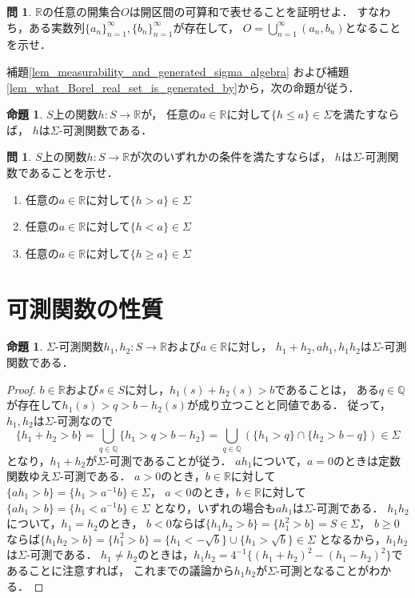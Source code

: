 \documentclass{jsreport}
\theoremstyle{definition}
\newtheorem{prop}[defi]{命題}
\newtheorem{qst}[defi]{問}
\begin{document}
\begin{qst}\label{qst_real_open_set_is_countable_union_of_open_interval}
$\mathbb{R}$の任意の開集合$O$は開区間の可算和で表せることを証明せよ．
すなわち，ある実数列$\{a_n\}_{n=1}^\infty, \{b_n\}_{n=1}^\infty$が存在して，
$O=\displaystyle\bigcup_{n=1}^\infty(a_n,b_n)$となることを示せ．
\end{qst}

補題\ref{lem_measurability_and_generated_sigma_algebra}
および補題\ref{lem_what_Borel_real_set_is_generated_by}から，次の命題が従う．

\begin{prop}\label{prop_technique_to_check_measurability}
$S$上の関数$h \colon S\to\mathbb{R}$が，
任意の$a\in\mathbb{R}$に対して$\{h \leq a\}\in\Sigma$を満たすならば，
$h$は$\Sigma$-可測関数である．
\end{prop}

\begin{qst}\label{qst_technique_to_check_measurability}
$S$上の関数$h \colon S\to\mathbb{R}$が次のいずれかの条件を満たすならば，
$h$は$\Sigma$-可測関数であることを示せ．
\begin{enumerate}
\item 任意の$a\in\mathbb{R}$に対して$\{h > a\}\in\Sigma$
\item 任意の$a\in\mathbb{R}$に対して$\{h < a\}\in\Sigma$
\item 任意の$a\in\mathbb{R}$に対して$\{h \geq a\}\in\Sigma$
\end{enumerate}
\end{qst}

\section{可測関数の性質}

\begin{prop}\label{prop_measurable_function_and_arithmetic}
$\Sigma$-可測関数$h_1,h_2 \colon S\to\mathbb{R}$および$a\in\mathbb{R}$に対し，
$h_1+h_2, ah_1, h_1h_2$は$\Sigma$-可測関数である．
\end{prop}

\begin{proof}
$b\in\mathbb{R}$および$s \in S$に対し，$h_1(s)+h_2(s)>b$であることは，
ある$q\in\mathbb{Q}$が存在して$h_1(s)>q>b-h_2(s)$が成り立つことと同値である．
従って，$h_1,h_2$は$\Sigma$-可測なので
\[ \{h_1+h_2>b\}=\bigcup_{q\in\mathbb{Q}}\{h_1>q>b-h_2\}
=\bigcup_{q\in\mathbb{Q}}(\{h_1>q\}\cap\{h_2>b-q\})\in\Sigma \]
となり，$h_1+h_2$が$\Sigma$-可測であることが従う．
$ah_1$について，$a=0$のときは定数関数ゆえ$\Sigma$-可測である．
$a>0$のとき，$b\in\mathbb{R}$に対して$\{ah_1>b\}=\{h_1>a^{-1}b\}\in\Sigma$，
$a<0$のとき，$b\in\mathbb{R}$に対して$\{ah_1>b\}=\{h_1<a^{-1}b\}\in\Sigma$
となり，いずれの場合も$ah_1$は$\Sigma$-可測である．
$h_1h_2$について，$h_1=h_2$のとき，
$b<0$ならば$\{h_1h_2>b\}=\{h_1^2>b\}=S\in\Sigma$，
$b\geq0$ならば$\{h_1h_2>b\}=\{h_1^2>b\}=\{h_1<-\sqrt{b}\}\cup\{h_1>\sqrt{b}\}\in\Sigma$
となるから，$h_1h_2$は$\Sigma$-可測である．
$h_1 \neq h_2$のときは，$h_1h_2=4^{-1}\{(h_1+h_2)^2-(h_1-h_2)^2\}$であることに注意すれば，
これまでの議論から$h_1h_2$が$\Sigma$-可測となることがわかる．
\end{proof}
\end{document}
